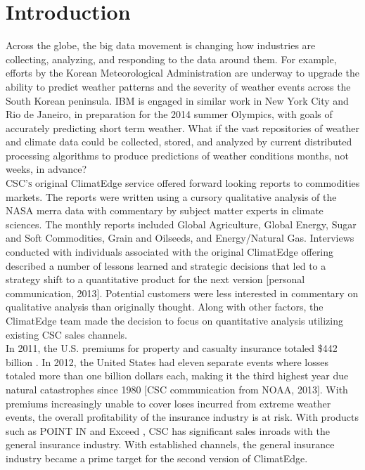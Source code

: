 \section{Introduction}
Across the globe, the big data movement is changing how industries are collecting, analyzing, and responding to the data around them. For example, efforts by the Korean Meteorological Administration are underway to upgrade the ability to predict weather patterns and the severity of weather events across the South Korean peninsula. IBM is engaged in similar work in New York City and Rio de Janeiro, in preparation for the 2014 summer Olympics, with goals of accurately predicting short term weather\cite{rwe}. What if the vast repositories of weather and climate data could be collected, stored, and analyzed by current distributed processing algorithms to produce predictions of weather conditions months, not weeks, in advance?\\

\textsc{CSC's} original ClimatEdge\texttrademark{} service offered forward looking reports to commodities markets. The reports were written using  a cursory qualitative analysis of the NASA \gls{merra} data with commentary by subject matter experts in climate sciences. The monthly reports included Global Agriculture, Global Energy, Sugar and Soft Commodities, Grain and Oilseeds, and Energy/Natural Gas\cite{climatedgeurl}. Interviews conducted with  individuals associated with the original ClimatEdge offering described a number of lessons learned and strategic decisions that led to a strategy shift to a quantitative product for the next version [personal communication, 2013]. Potential customers were less interested in commentary on qualitative analysis than originally thought. Along with other factors, the ClimatEdge team made the decision to focus on quantitative analysis utilizing existing CSC sales channels. \\

In 2011, the U.S. premiums for property and casualty insurance totaled \$442 billion \cite{iii}. In 2012, the United States had eleven separate events where losses totaled more than one billion dollars each, making it the third highest year due natural catastrophes since 1980  [\textsc{CSC} communication from NOAA, 2013]. With premiums  increasingly unable to cover loses incurred from extreme weather events, the overall profitability of the insurance industry is at risk. With products such as POINT IN \cite{point_in} and Exceed \cite{exceed}, \textsc{CSC} has significant sales inroads with the general insurance industry. With established channels, the general insurance industry became a prime target for the second version of ClimatEdge.\\

